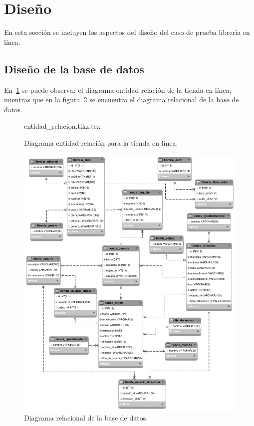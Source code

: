 %
%

\section{Diseño}
En esta sección se incluyen los aspectos del diseño del caso de prueba
librería en línea.

\subsection{Diseño de la base de datos}
En~\ref{lib_fig:entidad_relacion} se puede observar el diagrama
entidad relación de la tienda en línea; mientras que
en la figura~\ref{lib_fig:relacional} se encuentra el diagrama relacional de
la base de datos.

\begin{figure}
  \begin{center}
    {entidad_relacion.tikz.tex}
    \caption{Diagrama entidad-relación para la tienda en línea.}
    \label{lib_fig:entidad_relacion}
  \end{center}
\end{figure}

\begin{figure}
  \begin{center}
    \includegraphics[width=1.0\linewidth]{diagramas/relacional.png}
    \caption{Diagrama relacional de la base de datos.}
    \label{lib_fig:relacional}
  \end{center}
\end{figure}

